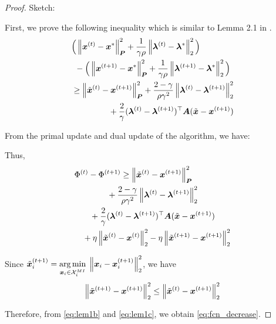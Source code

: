 \documentclass[twocolumn,amsthm]{autart}%
\theoremstyle{definition}
\theoremstyle{plain}
\newtheorem{theorem}{Theorem}
\begin{document}
\begin{proof}
Sketch:

First, we prove the following inequality which is similar to Lemma 2.1 in \cite{deng2017parallel}.
\begin{equation}
\label{eq:lem1a}
\begin{multlined}
\Big( \norm{\bbsym{x}^{(t)}-\bbsym{x}^{*}}^2_{\bbsym{P}}
+ \frac{1}{\gamma \rho} \norm{\bbsym{\lambda}^{(t)}-\bbsym{\lambda}^{*}}_2^2 \Big) \\
- \Big(\norm{\bbsym{x}^{(t+1)}-\bbsym{x}^{*}}^2_{\bbsym{P}}
+ \frac{1}{\gamma \rho} \norm{\bbsym{\lambda}^{(t+1)}-\bbsym{\lambda}^{*}}_2^2 \Big) \\
\ge \norm{\xtil^{(t)}-\bbsym{x}^{(t+1)}}_{\bbsym{P}}^2
+ \frac{2-\gamma}{\rho \gamma^2} \norm{\bbsym{\lambda}^{(t)}-\bbsym{\lambda}^{(t+1)}}_2^2 \\
+ \frac{2}{\gamma} (\bbsym{\lambda}^{(t)}-\bbsym{\lambda}^{(t+1)})^\top \bbsym{A} (\xtil-\bbsym{x}^{(t+1)})
\end{multlined}
\end{equation}

From the primal update and dual update of the algorithm, we have:


Thus, 
\begin{equation}
\label{eq:lem1b}
\begin{multlined}
\Phi^{(t)} - \Phi^{(t+1)} 
\ge \norm{\xtil^{(t)}-\bbsym{x}^{(t+1)}}_{\bbsym{P}}^2  \\
+ \frac{2-\gamma}{\rho \gamma^2} \norm{\bbsym{\lambda}^{(t)}-\bbsym{\lambda}^{(t+1)}}_2^2 \\
+ \frac{2}{\gamma} (\bbsym{\lambda}^{(t)}-\bbsym{\lambda}^{(t+1)})^\top \bbsym{A} (\xtil-\bbsym{x}^{(t+1)}) \\
+ \eta \norm{\xtil^{(t)}-\bbsym{x}^{(t)}}_2^2 - \eta \norm{\xtil^{(t+1)}-\bbsym{x}^{(t+1)}}_2^2 
\end{multlined}
\end{equation}

Since $\Tilde{\boldsymbol{x}}_i^{(t+1)} = \underset{\boldsymbol{x}_i \in \mathcal{X}_i^{\relax{MI}}}{\operatorname*{arg\,min}} \;\left\lVert \boldsymbol{x}_i - \boldsymbol{x}_i^{(t+1)} \right\rVert_2^2$, we have
\begin{equation}
\label{eq:lem1c}
\left\lVert \Tilde{\boldsymbol{x}}^{(t+1)} - \boldsymbol{x}^{(t+1)} \right\rVert_2^2 
\le \left\lVert \Tilde{\boldsymbol{x}}^{(t)} - \boldsymbol{x}^{(t+1)} \right\rVert_2^2 
\end{equation}

Therefore, from \eqref{eq:lem1b} and \eqref{eq:lem1c}, we obtain \eqref{eq:fcn_decrease}.
\end{proof}
\end{document}
